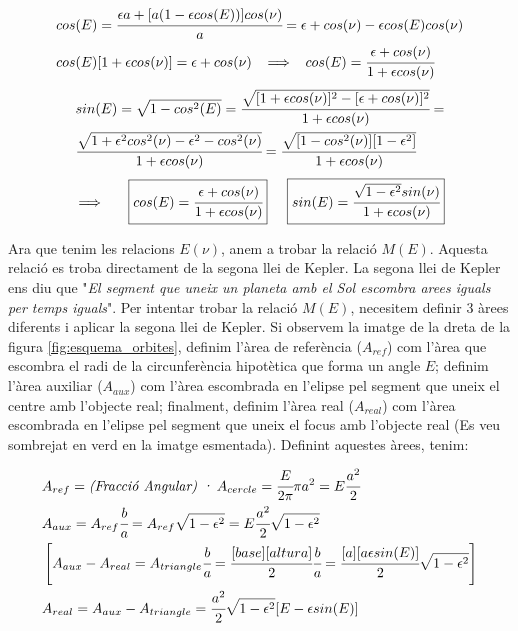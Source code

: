 \documentclass[a4paper, 11pt]{article}
\begin{document}
\begin{align*}
    &cos(E) = \cfrac{\epsilon a + [a(1-\epsilon cos(E))] cos(\nu)}{a} = \epsilon + cos(\nu) - \epsilon cos(E) cos(\nu)\\
    &cos(E)[1+\epsilon cos(\nu)] = \epsilon + cos(\nu) \hspace{2mm} \implies \hspace{2mm} cos(E) = \cfrac{\epsilon + cos(\nu)}{1 + \epsilon cos(\nu)} \\
\end{align*}
\begin{align*}
    &sin(E) = \sqrt{1 - cos^2(E)} = \cfrac{\sqrt{[1+\epsilon cos(\nu)]^2 - [\epsilon + cos(\nu)]^2}}{1+\epsilon cos(\nu)} = \\
    &\cfrac{\sqrt{1 + \epsilon^2 cos^2(\nu) - \epsilon^2 - cos^2(\nu)}}{1+\epsilon cos(\nu)} = \cfrac{\sqrt{[1-cos^2(\nu)][1-\epsilon^2]}}{1+\epsilon cos(\nu)}
\end{align*}
\vspace{2mm}
\begin{equation} \label{relacions_Enu}
    \implies \hspace{5mm} \boxed{cos(E) = \cfrac{\epsilon + cos(\nu)}{1 + \epsilon cos(\nu)}} \hspace{5mm} \boxed{sin(E) = \cfrac{\sqrt{1-\epsilon^2}sin(\nu)}{1 + \epsilon cos(\nu)}}
\end{equation}
\vspace{2mm}

\noindent Ara que tenim les relacions $E(\nu)$, anem a trobar la relació $M(E)$. Aquesta relació es troba directament de la segona llei de Kepler. La segona llei de Kepler ens diu que "\textit{El segment que uneix un planeta amb el Sol escombra arees iguals per temps iguals}". Per intentar trobar la relació $M(E)$, necesitem definir 3 àrees diferents i aplicar la segona llei de Kepler. Si observem la imatge de la dreta de la figura \ref{fig:esquema_orbites}, definim l'àrea de referència ($A_{ref}$) com l'àrea que escombra el radi de la circunferència hipotètica que forma un angle $E$; definim l'àrea auxiliar ($A_{aux}$) com l'àrea escombrada en l'elipse pel segment que uneix el centre amb l'objecte real; finalment, definim l'àrea real ($A_{real}$) com l'àrea escombrada en l'elipse pel segment que uneix el focus amb l'objecte real (Es veu sombrejat en verd en la imatge esmentada). Definint aquestes àrees, tenim:

\begin{align*}
    &A_{ref} = \textit{(Fracció Angular) ·} \hspace{1mm}  A_{cercle} = \cfrac{E}{2\pi}\pi a^2 = E\cfrac{a^2}{2} \\
    &A_{aux} = A_{ref} \cfrac{b}{a} = A_{ref} \sqrt{1-\epsilon^2} = E\cfrac{a^2}{2} \sqrt{1-\epsilon^2} \\
    &\left[ A_{aux} - A_{real} = A_{triangle}\cfrac{b}{a} = \cfrac{[base][altura]}{2}\cfrac{b}{a} = \cfrac{[a][a\epsilon sin(E)]}{2} \sqrt{1-\epsilon ^2} \right] \\
    &A_{real} = A_{aux} - A_{triangle} = \cfrac{a^2}{2} \sqrt{1-\epsilon^2} [E - \epsilon sin(E)] \\
\end{align*}
\end{document}
